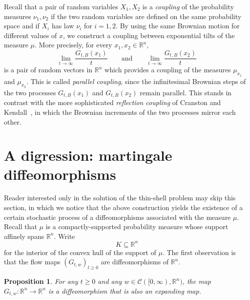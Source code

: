 \documentclass[12pt,a4paper]{article}
\newcommand{\RR}{\mathbb{R}}
\newcommand{\R}{\mathbb{R}}
\newcommand{\cC}{\mathcal C}
\newtheorem{proposition}[theorem]{Proposition}
\theoremstyle{definition}
\begin{document}
Recall that a pair of random variables $X_1,X_2$ is a {\it coupling} 
of the probability measures $\nu_1, \nu_2$ if the two random variables are defined on the same 
probability space and if $X_i$ has law $\nu_i$ for $i=1,2$.
By using the same Brownian motion for different values of $x$, we
construct a coupling between  exponential tilts
of the measure $\mu$. More precisely, for every $x_1,x_2\in \R^n$,
\[
\lim_{t\to \infty} \frac{ G_{t,B} (x_1)}{t} \qquad \textrm{and} \qquad \lim_{t\to \infty} \frac{ G_{t,B} (x_2)}{t} 
\]
is a pair of random vectors in $\RR^n$ which provides a coupling of the measures $\mu_{x_1}$ and $\mu_{x_2}$.
This is called \emph{parallel coupling}, since
the infinitesimal Brownian steps of the two processes
$G_{t,B}(x_1)$ and $G_{t,B}(x_2)$ remain parallel. This
stands in contrast with the more sophisticated \emph{reflection coupling}
of Cranston and Kendall~\cite{LRog}, in which the Brownian
increments of the two processes mirror each other.


\section{A digression: martingale diffeomorphisms}
\label{digress}

Reader interested only in the solution of the
thin-shell problem may skip this section, 
in which we notice that the
above construction yields the existence of a certain stochastic process of a diffeomorphisms associated with the measure $\mu$.
Recall that $\mu$ is a compactly-supported probability measure whose support
affinely spans $\RR^n$. Write $$ K \subseteq \RR^n $$ for
the interior of the convex hull of the support of $\mu$.
The first observation is that the flow maps $(G_{t,w})_{t \geq 0}$ are diffeomorphisms of $\R^n$. 

\begin{proposition} \label{prop_1456}
For any $t \geq 0$ and any $w \in \cC([0, \infty), \RR^n)$, the map $G_{t,w}: \RR^n \rightarrow \RR^n$ is a diffeomorphism that is also an expanding map.
\end{proposition}
\end{document}
